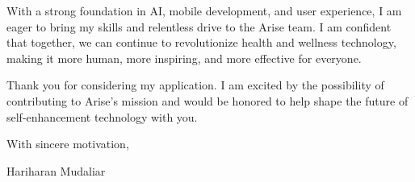 \documentclass[letterpaper,11pt]{article}
\begin{document}
With a strong foundation in AI, mobile development, and user experience, I am eager to bring my skills and relentless drive to the Arise team. I am confident that together, we can continue to revolutionize health and wellness technology, making it more human, more inspiring, and more effective for everyone.

Thank you for considering my application. I am excited by the possibility of contributing to Arise’s mission and would be honored to help shape the future of self-enhancement technology with you.

With sincere motivation,

Hariharan Mudaliar
\end{document}
